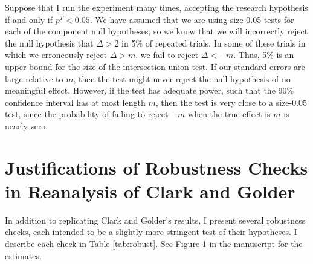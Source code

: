 \documentclass[12pt]{article}
\begin{document}
Suppose that I run the experiment many times, accepting the research hypothesis if and only if $p^T < 0.05$. We have assumed that we are using size-0.05 tests for each of the component null hypotheses, so we know that we will incorrectly reject the null hypothesis that $\Delta > 2$ in 5\% of repeated trials. In some of these trials in which we erroneously reject $\Delta > m$, we fail to reject $\Delta < -m.$ Thus, 5\% is an upper bound for the size of the intersection-union test. If our standard errors are large relative to $m$, then the test might never reject the null hypothesis of no meaningful effect. However, if the test has adequate power, such that the 90\% confidence interval has at most length $m$, then the test is very close to a size-$0.05$ test, since the probability of failing to reject $-m$ when the true effect is $m$ is nearly zero.

\section*{Justifications of Robustness Checks in Reanalysis of Clark and Golder}

In addition to replicating Clark and Golder's results, I present several robustness checks, each intended to be a slightly more stringent test of their hypotheses. I describe each check in Table \ref{tab:robust}. See Figure 1 in the manuscript for the estimates.
\end{document}
